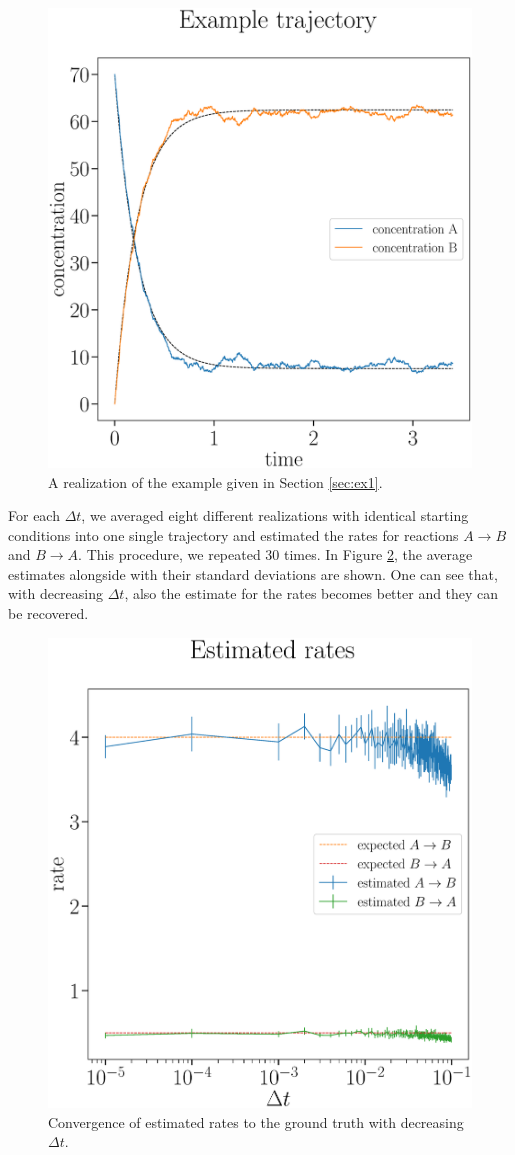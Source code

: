 \documentclass[oneside, abstracton, titlepage]{scrartcl}
\begin{document}
	\begin{figure}
		\begin{center}
			\includegraphics[width=.5\textwidth]{./figures_tex/aux_ex1_concentration_curves}
		\end{center}
		\caption{A realization of the example given in Section \ref{sec:ex1}.}
		\label{ex1:concentration-curves}
	\end{figure}
	
	For each $\Delta t$, we averaged eight different realizations with identical starting conditions into one single trajectory and estimated the rates for reactions $A\to B$ and $B\to A$. This procedure, we repeated $30$ times. In Figure \ref{ex1:rates-convergence}, the average estimates alongside with their standard deviations are shown. One can see that, with decreasing $\Delta t$, also the estimate for the rates becomes better and they can be recovered.
	
	\begin{figure}
		\begin{center}
			\includegraphics[width=.5\textwidth]{./figures_tex/aux_rates_convergence}
		\end{center}
		\caption{Convergence of estimated rates to the ground truth with decreasing $\Delta t$.}
		\label{ex1:rates-convergence}
	\end{figure}
	
\end{document}
